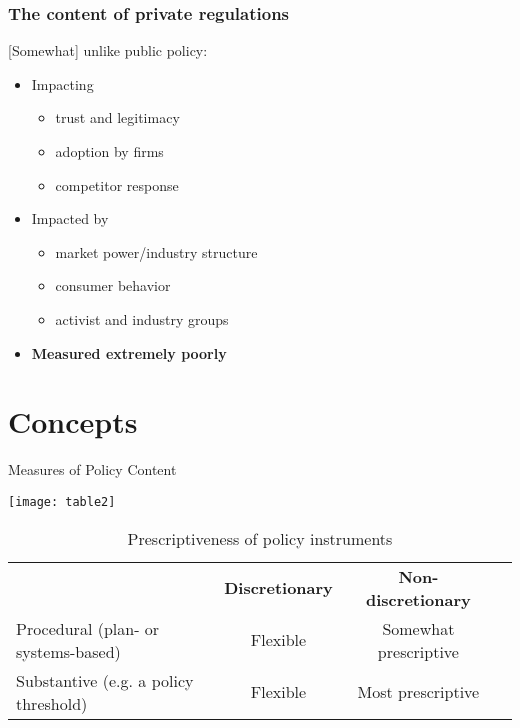 \begin{frame}
\frametitle{The content of private regulations}
[Somewhat] unlike public policy: \begin{itemize}
	\item Impacting \begin{itemize}
      \item trust and legitimacy
      \item adoption by firms
      \item competitor response \end{itemize} \pause
	\item Impacted by \begin{itemize}
		\item market power/industry structure
        \item consumer behavior 
        \item activist and industry groups
	\end{itemize} \pause
    \item \textbf{Measured extremely poorly}
\end{itemize}
\end{frame}



\section{Concepts}


\begin{frame}
\begin{table}[h!]
\renewcommand{\arraystretch}{1.5} 
\centering
\caption{Measures of Policy Content}
\label{questions}
\end{table}
\centering
\texttt{[image: table2]}
\end{frame}


\begin{frame}
\begin{table}[h!]
\footnotesize
\renewcommand{\arraystretch}{1.5} 
\centering
\caption{Prescriptiveness of policy  instruments}
\label{prescriptiveness}
\begin{tabular}{lccc}
 & \textbf{Discretionary} & \textbf{Non-discretionary} \\
 \cline{2-3} 
Procedural (plan- or systems-based) & Flexible & Somewhat prescriptive \\
 \cline{2-3} 
Substantive (e.g. a policy threshold) & Flexible & Most prescriptive \\
 \cline{2-3} 
\end{tabular}
\end{table}
\end{frame}



